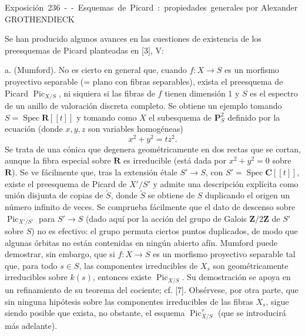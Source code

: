 \unit{Exposición 236 -- Esquemas de Picard: propiedades generales}
%
  {por Alexander GROTHENDIECK}


Se han producido algunos avances en las cuestiones de existencia de los
preesquemas de Picard planteadas en [3], V:

\medskip
\noindent a. (Mumford). No es cierto en general que, cuando
$f:X\longrightarrow S$ es un morfismo proyectivo separable (= plano con fibras
separables), exista el preesquema de Picard $\operatorname{Pic}_{X/S}$, ni
siquiera si las fibras de $f$ tienen dimensión 1 y $S$ es el espectro de un
anillo de valoración discreta completo. Se obtiene un ejemplo tomando
$S=\operatorname{Spec}\mathbf R[[t]]$ y tomando como $X$ el subesquema de
$\mathbf P^2_S$ definido por la ecuación (donde $x,y,z$ son variables
homogéneas)
\[
x^2+y^2=tz^2.
\]
Se trata de una cónica que degenera geométricamente en dos rectas que se
cortan, aunque la fibra especial sobre $\mathbf R$ es irreducible (está dada
por $x^2+y^2=0$ sobre $\mathbf R$). Se ve fácilmente que, tras la extensión
étale $S'\longrightarrow S$, con $S'=\operatorname{Spec}\mathbf C[[t]]$, existe
el preesquema de Picard de $X'/S'$ y admite una descripción explícita como
unión disjunta de copias de $\widetilde S$, donde $\widetilde S$ se obtiene de
$S$ duplicando el origen un número infinito de veces. Se comprueba fácilmente
que el dato de descenso sobre $\operatorname{Pic}_{X'/S'}$ para
$S'\longrightarrow S$ (dado aquí por la acción del grupo de Galois
$\mathbf Z/2\mathbf Z$ de $S'$ sobre $S$) no es efectivo: el grupo permuta
ciertos puntos duplicados, de modo que algunas órbitas no están contenidas en
ningún abierto afín. Mumford puede demostrar, sin embargo, que si
$f:X\longrightarrow S$ es un morfismo proyectivo separable tal que, para todo
$s\in S$, las componentes irreducibles de $X_s$ son geométricamente
irreducibles sobre $k(s)$, entonces existe $\operatorname{Pic}_{X/S}$. Su
demostración se apoya en un refinamiento de su teorema del cociente; cf. [7].
Obsérvese, por otra parte, que sin ninguna hipótesis sobre las componentes
irreducibles de las fibras $X_s$, sigue siendo posible que exista, no obstante,
el esquema $\operatorname{Pic}^{\tau}_{X/S}$ (que se introducirá más adelante).

